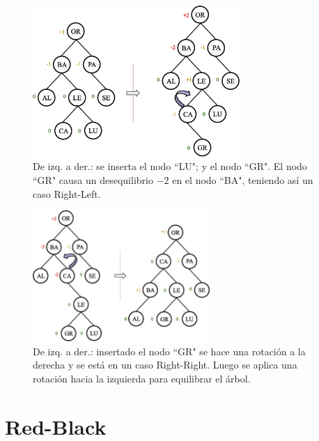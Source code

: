 \begin{figure}[htpb!]
  \begin{center}
    \includegraphics[width=0.7\textwidth]{images/AVLInsertion5.eps}
  \end{center}
  \caption{De izq. a der.: se inserta el nodo ``LU"; y el nodo ``GR". El nodo ``GR" causa un desequilibrio $-2$ en el nodo ``BA", teniendo así un caso Right-Left.}
  \label{fig:AVLInsertion5}
\end{figure}


\begin{figure}[htpb!]
  \begin{center}
    \includegraphics[width=0.6\textwidth]{images/AVLInsertion6.eps}
  \end{center}
  \caption{De izq. a der.: insertado el nodo ``GR" se hace una rotación a la derecha y se está en un caso Right-Right. Luego se aplica una rotación hacia la izquierda para equilibrar el árbol.}
  \label{fig:AVLInsertion6}
\end{figure}

\section{Red-Black}

